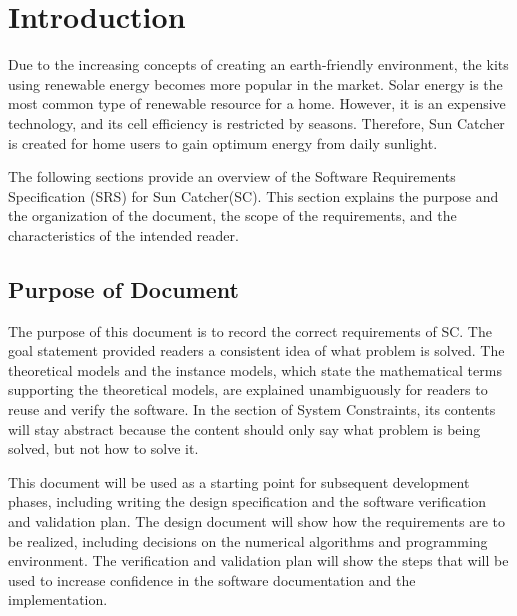 \documentclass[12pt]{article}
\begin{document}
\section{Introduction}

\medskip

Due to the increasing concepts of creating an earth-friendly environment, the kits using renewable energy becomes more popular in the market. Solar energy is the most common type of renewable resource for a home. However, it is an expensive technology, and its cell efficiency is restricted by seasons. Therefore, Sun Catcher is created for home users to gain optimum energy from daily sunlight.


The following sections provide an overview of the Software Requirements Specification (SRS) for Sun Catcher(SC). This section explains the purpose and the organization of the document, the scope of the requirements, and the characteristics of the intended reader.

\subsection{Purpose of Document}

\medskip

The purpose of this document is to record the correct requirements of SC. The goal statement provided readers a consistent idea of what problem is solved. The theoretical models and the instance models, which state the mathematical terms supporting the theoretical models, are explained unambiguously for readers to reuse and verify the software. In the section of System Constraints, its contents will stay abstract because the content should only say what problem is being solved, but not how to solve it.

This document will be used as a starting point for subsequent development phases, including writing the design specification and the software verification and validation plan.
The design document will show how the requirements are to be realized, including decisions
on the numerical algorithms and programming environment. The verification and validation
plan will show the steps that will be used to increase confidence in the software documentation and the implementation. 
\end{document}
